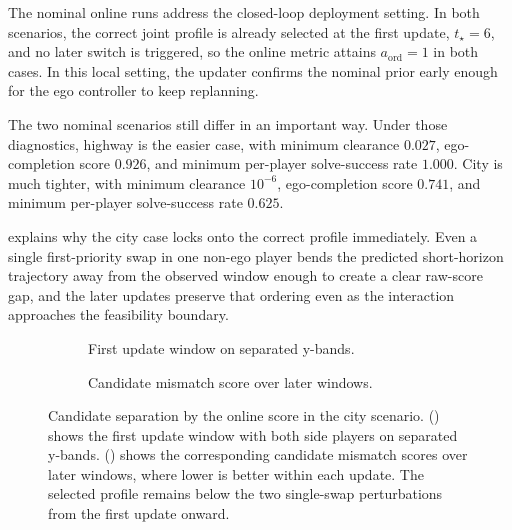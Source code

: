 The nominal online runs address the closed-loop deployment setting.
In both scenarios, the correct joint profile is already selected at the first update, $t_\star = 6$, and no later
switch is triggered, so the online metric attains $a_{\mathrm{ord}} = 1$ in both cases.
In this local setting, the updater confirms the nominal prior early enough for the ego controller to keep replanning.

The two nominal scenarios still differ in an important way.
Under those diagnostics, highway is the easier case, with minimum clearance $0.027$, ego-completion score
$0.926$, and minimum per-player solve-success rate $1.000$.
City is much tighter, with minimum clearance $10^{-6}$, ego-completion score $0.741$, and minimum per-player
solve-success rate $0.625$.

 explains why the city case locks onto the correct profile immediately.
Even a single first-priority swap in one non-ego player bends the predicted short-horizon trajectory away from the
observed window enough to create a clear raw-score gap, and the later updates preserve that ordering even as the
interaction approaches the feasibility boundary.

\begin{figure}[!t]
    \centering
    \begin{subfigure}[t]{0.485\linewidth}
        \centering
        
        \caption{First update window on separated y-bands.}
        \label{fig:online_discrimination_a}
    \end{subfigure}\hfill
    \begin{subfigure}[t]{0.485\linewidth}
        \centering
        
        \caption{Candidate mismatch score over later windows.}
        \label{fig:online_discrimination_b}
    \end{subfigure}
    \caption{Candidate separation by the online score in the city scenario.
    () shows the first update window with both side players on separated y-bands.
    () shows the corresponding candidate mismatch scores over later windows, where lower is better within each update.
    The selected profile remains below the two single-swap perturbations from the first update onward.}
    \label{fig:online_discrimination}
\end{figure}

